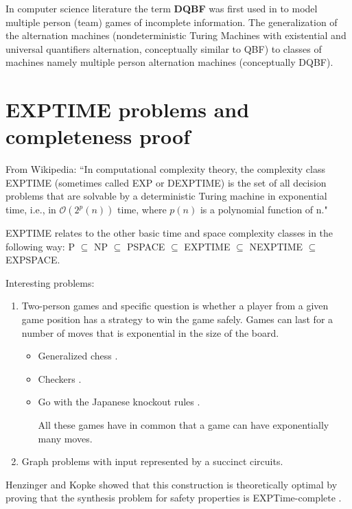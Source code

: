 \documentclass[runningheads]{llncs}
\newcommand{\bigo}{\mathcal{O}}
\begin{document}
In computer science literature the term \textbf{DQBF} was first used in \cite{peterson1979multiple} to model multiple person (team) games of incomplete information.
The generalization of the alternation machines (nondeterministic Turing Machines with existential and universal quantifiers alternation, conceptually similar to QBF) to classes of machines namely multiple person alternation machines (conceptually DQBF).


\section{EXPTIME problems and completeness proof}
From Wikipedia:
``In computational complexity theory, the complexity class EXPTIME (sometimes called EXP or DEXPTIME) is the set of all decision problems that are solvable by a deterministic Turing machine in exponential time, i.e., in $\bigo(2^p(n))$ time, where $p(n)$ is a polynomial function of n."

EXPTIME relates to the other basic time and space complexity classes in the following way: 
P $\subseteq$ NP $\subseteq$ PSPACE $\subseteq$ EXPTIME $\subseteq$ NEXPTIME $\subseteq$ EXPSPACE. 

Interesting problems:
\begin{enumerate}
  \item Two-person games and specific question is whether a player from a given game position has a strategy to win the game safely. Games can last for a number of moves that is exponential in the size of the board.
  \begin{itemize}
    \item Generalized chess \cite{fraenkel81}.
    \item Checkers \cite{robson84}.
    \item Go with the Japanese knockout rules \cite{robson83}.
    
    All these games have in common that a game can have exponentially many moves.
  \end{itemize}
\item Graph problems with input represented by a succinct circuits. 
\end{enumerate}

Henzinger and Kopke showed that this construction is theoretically optimal by proving that the synthesis problem for safety properties is EXPTime-complete \cite{henzingerk99}.
\end{document}
